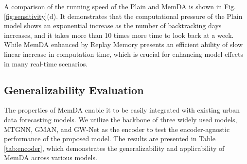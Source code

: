 \documentclass[sigconf]{acmart}
\begin{document}
A comparison of the running speed of the Plain and MemDA is shown in Fig. \ref{fig:sensitivity}(d). It demonstrates that the computational pressure of the Plain model shows an exponential increase as the number of backtracking days increases, and it takes more than 10 times more time to look back at a week. While MemDA enhanced by Replay Memory presents an efficient ability of slow linear increase in computation time, which is crucial for enhancing model effects in many real-time scenarios.

\subsection{Generalizability Evaluation}
The properties of MemDA enable it to be easily integrated with existing urban data forecasting models. We utilize the backbone of three widely used models, MTGNN, GMAN, and GW-Net as the encoder to test the encoder-agnostic performance of the proposed model. The results are presented in Table \ref{tab:encoder}, which demonstrates the generalizability and applicability of MemDA across various models. 

\begin{table}[h]
	\centering
	\caption{Encoder-agnostic Performance Evaluation}
	\label{tab:encoder}
	\addtolength{\tabcolsep}{-0.8pt}
\end{table}
\end{document}
